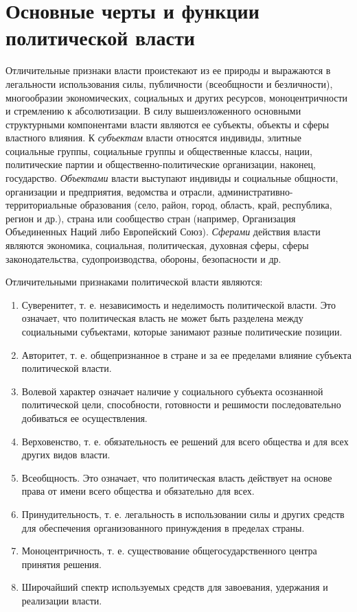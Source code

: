 \pagebreak %

\chapter{Основные черты и функции политической власти}

Отличительные признаки власти проистекают из ее природы и выражаются в
легальности использования силы, публичности (всеобщности и безличности),
многообразии экономических, социальных и других ресурсов, моноцентричности и
стремлению к абсолютизации. В силу вышеизложенного основными структурными
компонентами власти являются ее субъекты, объекты и сферы властного влияния. К
\emph{субъектам} власти относятся индивиды, элитные социальные группы,
социальные группы и общественные классы, нации, политические партии и
общественно-политические организации, наконец, государство. \emph{Объектами}
власти выступают индивиды и социальные общности, организации и предприятия,
ведомства и отрасли, административно-территориальные образования (село, район,
город, область, край, республика, регион и др.), страна или сообщество стран
(например, Организация Объединенных Наций либо Европейский Союз).
\emph{Сферами} действия власти являются экономика, социальная, политическая,
духовная сферы, сферы законодательства, судопроизводства, обороны, безопасности
и др.

Отличительными признаками политической власти являются:
\begin{enumerate}
    \item Суверенитет, т. е. независимость и неделимость политической власти.
    Это означает, что политическая власть не может быть разделена между
    социальными субъектами, которые занимают разные политические позиции.
    \item Авторитет, т. е. общепризнанное в стране и за ее пределами влияние
    субъекта политической власти.
    \item Волевой характер означает наличие у социального субъекта осознанной
    политической цели, способности, готовности и решимости последовательно
    добиваться ее осуществления.
    \item Верховенство, т. е. обязательность ее решений для всего общества и
    для всех других видов власти.
    \item Всеобщность. Это означает, что политическая власть действует на
    основе права от имени всего общества и обязательно для всех.
    \item Принудительность, т. е. легальность в использовании силы и других
    средств для обеспечения организованного принуждения в пределах страны.
    \item Моноцентричность, т. е. существование общегосударственного центра
    принятия решения.
    \item Широчайший спектр используемых средств для завоевания, удержания и
    реализации власти.
\end{enumerate}

